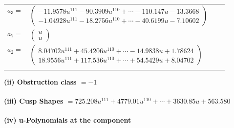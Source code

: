 \documentclass[1p]{elsarticle_modified}
\theoremstyle{definition}
\begin{document}
\begin{tabular}{m{7pt} m{180pt} m{7pt} m{180pt} }
\flushright $a_{3}=$&$\begin{pmatrix}-11.9578 u^{111}-90.3909 u^{110}+\cdots-110.147 u-13.3668\\-1.04928 u^{111}-18.2756 u^{110}+\cdots-40.6199 u-7.10602\end{pmatrix}$ \\
\flushright $a_{7}=$&$\begin{pmatrix}u\\u\end{pmatrix}$ \\
\flushright $a_{2}=$&$\begin{pmatrix}8.04702 u^{111}+45.4206 u^{110}+\cdots-14.9838 u+1.78624\\18.9556 u^{111}+117.536 u^{110}+\cdots+54.5429 u+8.04702\end{pmatrix}$\\&\end{tabular}
\flushleft \textbf{(ii) Obstruction class $= -1$}\\~\\
\flushleft \textbf{(iii) Cusp Shapes $= 725.208 u^{111}+4779.01 u^{110}+\cdots+3630.85 u+563.580$}\\~\\
\newpage\renewcommand{\arraystretch}{1}
\flushleft \textbf{(iv) u-Polynomials at the component}\newline \\
\end{document}
